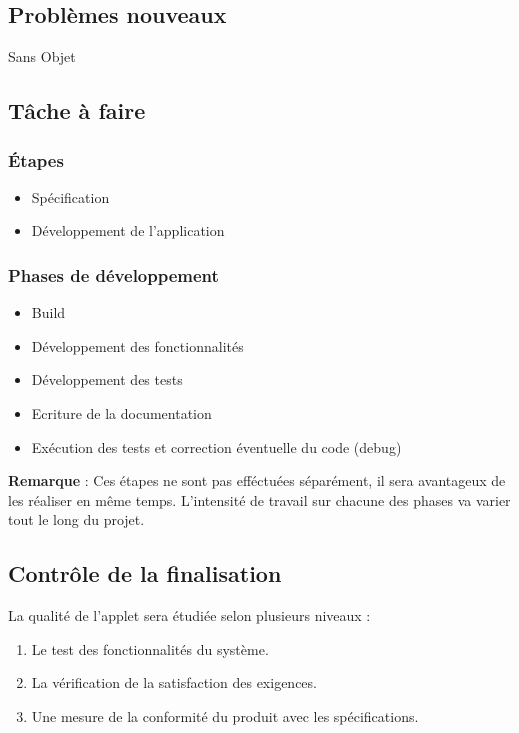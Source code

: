		\subsection{Problèmes nouveaux}
			Sans Objet
			
		\subsection{Tâche à faire}
			\subsubsection{Étapes}
				\begin{itemize}
				\item Spécification
				\item Développement de l'application
				\end{itemize}
				
			\subsubsection{Phases de développement}
				\begin{itemize}
				\item Build
				\item Développement des fonctionnalités
				\item Développement des tests
				\item Ecriture de la documentation
				\item Exécution des tests et correction éventuelle du code (debug)
				\end{itemize}
				
				\textbf{Remarque} : Ces étapes ne sont pas efféctuées séparément, il sera avantageux de les réaliser en même temps. L'intensité de travail sur chacune des phases va varier tout le long du projet.
				
		\subsection{Contrôle de la finalisation}
			La qualité de l'applet sera étudiée selon plusieurs niveaux :
			\begin{enumerate}
			\item Le test des fonctionnalités du système.
			\item La vérification de la satisfaction des exigences.
			\item Une mesure de la conformité du produit avec les spécifications.
			\end{enumerate}
			
